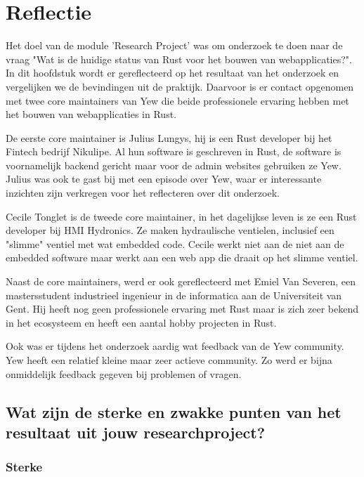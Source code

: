 \chapter{Reflectie}
\label{reflectie}

Het doel van de module 'Research Project' was om onderzoek te doen naar de vraag "Wat is de huidige
status van Rust voor het bouwen van webapplicaties?". In dit hoofdstuk wordt er gereflecteerd op het
resultaat van het onderzoek en vergelijken we de bevindingen uit de praktijk. Daarvoor is er contact
opgenomen met twee core maintainers van Yew die beide professionele ervaring hebben met het bouwen
van webapplicaties in Rust. 

De eerste core maintainer is Julius Lungys, hij is een Rust developer bij het Fintech bedrijf
Nikulipe. Al hun software is geschreven in Rust, de software is voornamelijk backend gericht maar
voor de admin websites gebruiken ze Yew. Julius was ook te gast bij 
\cite{podcast} met een episode over Yew, waar er interessante inzichten zijn verkregen voor het
reflecteren over dit onderzoek.

Cecile Tonglet is de tweede core maintainer, in het dagelijkse leven is ze een Rust developer bij
HMI Hydronics. Ze maken hydraulische ventielen, inclusief een "slimme" ventiel met wat embedded
code. Cecile werkt niet aan de niet aan de embedded software maar werkt aan een web app die draait
op het slimme ventiel.

Naast de core maintainers, werd er ook gereflecteerd met Emiel Van Severen, een mastersstudent
industrieel ingenieur in de informatica aan de Universiteit van Gent. Hij heeft nog geen
professionele ervaring met Rust maar is zich zeer bekend in het ecosysteem en heeft een aantal hobby
projecten in Rust.

Ook was er tijdens het onderzoek aardig wat feedback van de Yew community. Yew heeft een relatief
kleine maar zeer actieve community. Zo werd er bijna onmiddelijk feedback gegeven bij problemen of
vragen.

\clearpage

\section{Wat zijn de sterke en zwakke punten van het resultaat uit jouw researchproject?}

\subsection{Sterke}

